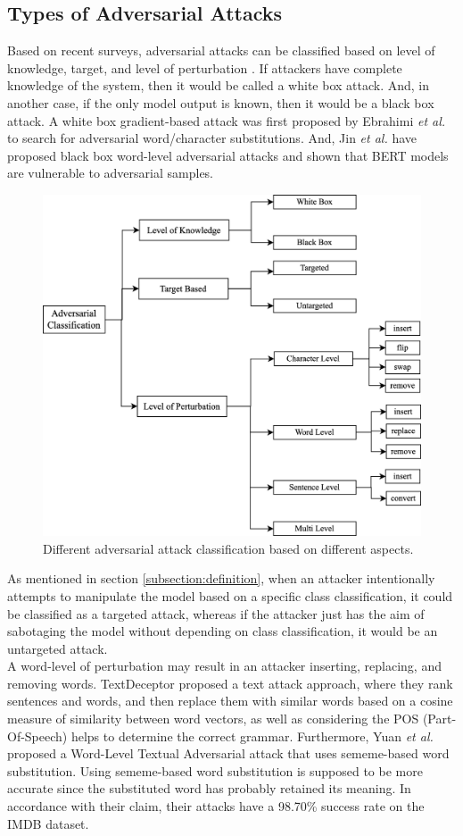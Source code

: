 \documentclass[%
	BCOR=8mm, %
	DIV=12,
	toc=bibliography, %
	toc=listof, %
	oneside, %
	egregdoesnotlikesansseriftitles, %
	]{scrbook}
\begin{document}
\subsection{Types of Adversarial Attacks}
\label{subsection:attacktypes}
Based on recent surveys, adversarial attacks can be classified based on level of knowledge, target, and level of perturbation \cite{huq_adversarial_2020-1,wang_towards_2021}. If attackers have complete knowledge of the system, then it would be called a  white box attack. And, in another case, if the only model output is known, then it would be a black box attack. A white box gradient-based attack was first proposed by Ebrahimi \textit{et al.} \cite{ebrahimi_hotflip_2018} to search for adversarial word/character substitutions. And, Jin \textit{et al.} \cite{jin_is_2020} have proposed black box word-level adversarial attacks and shown that BERT models are vulnerable to adversarial samples.\\
\begin{figure}[h!]
    \centering
    \includegraphics[width=0.65\linewidth]{img/attack_classification.png}
    \caption[Adversarial attacks classification diagram]{Different adversarial attack classification based on different aspects.}
    \label{fig:attack_classification}
\end{figure}
As mentioned in section \ref{subsection:definition}, when an attacker intentionally attempts to manipulate the model based on a specific class classification, it could be classified as a targeted attack, whereas if the attacker just has the aim of sabotaging the model without depending on class classification, it would be an untargeted attack.\\
A word-level of perturbation may result in an attacker inserting, replacing, and removing words. TextDeceptor \cite{saxena_textdecepter_2020} proposed a text attack approach, where they rank sentences and words, and then replace them with similar words based on a cosine measure of similarity between word vectors, as well as considering the POS (Part-Of-Speech) helps to determine the correct grammar. Furthermore, Yuan \textit{et al.} \cite{zang_word-level_2019} proposed a Word-Level Textual Adversarial attack that uses sememe-based word substitution. Using sememe-based word substitution is supposed to be more accurate since the substituted word has probably retained its meaning. In accordance with their claim, their attacks have a 98.70\% success rate on the IMDB dataset.\\
\end{document}
